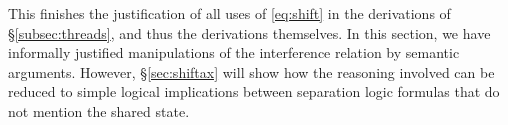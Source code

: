 This finishes the justification of all uses of \eqref{eq:shift} in the
derivations of \S\ref{subsec:threads}, and thus the derivations
themselves.  In this section, we have informally justified
manipulations of the interference relation by semantic
arguments. However, \S\ref{sec:shiftax} will show how the reasoning
involved can be reduced to simple logical implications between
separation logic formulas that do not mention the shared state.

